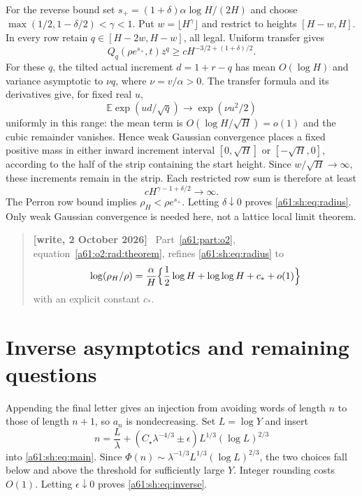 \documentclass[11pt,letterpaper]{article}
\numberwithin{equation}{section}
\theoremstyle{remark}\newtheorem{remark}[theorem]{Remark}
\newcommand{\st}{\star}
\newenvironment{writenote}{\par\smallskip\begin{quote}\small\textbf{[write, 2 October 2026]}\ }{\end{quote}\smallskip}
\begin{document}
For the reverse bound set $s_+=(1+\delta)\alpha\log H/(2H)$ and choose
$\max(1/2,1-\delta/2)<\gamma<1$. Put $w=\lfloor H^\gamma\rfloor$ and restrict to heights $[H-w,H]$. In every row retain $q\in[H-2w,H-w]$, all legal. Uniform transfer gives
\[
 Q_q(\rho e^{s_+},t)z^q
 \ge cH^{-3/2+(1+\delta)/2}.
\]
For these $q$, the tilted actual increment $d=1+r-q$ has mean $O(\log H)$ and variance asymptotic to $\nu q$, where $\nu=v/\alpha>0$. The transfer formula and its derivatives give, for fixed real $u$,
\[\mathbb E\exp(ud/\sqrt q)\longrightarrow\exp(\nu u^2/2)\]
uniformly in this range: the mean term is $O(\log H/\sqrt H)=o(1)$ and the cubic remainder vanishes. Hence weak Gaussian convergence places a fixed positive mass in either inward increment interval $[0,\sqrt H]$ or $[-\sqrt H,0]$, according to the half of the strip containing the start height. Since $w/\sqrt H\to\infty$, these increments remain in the strip. Each restricted row sum is therefore at least
\[
 cH^{\gamma-1+\delta/2}\longrightarrow\infty.
\]
The Perron row bound implies $\rho_H<\rho e^{s_+}$. Letting $\delta\downarrow0$ proves \eqref{a61:sh:eq:radius}. Only weak Gaussian convergence is needed here, not a lattice local limit theorem.
\begin{writenote}
Part~\ref{a61:part:o2}, equation~\eqref{a61:o2:rad:theorem}, refines \eqref{a61:sh:eq:radius} to
\[
 \log(\rho_H/\rho)=\frac\alpha H\Bigl\{\frac12\log H+\log\log H+c_*+o(1)\Bigr\}
\]
with an explicit constant $c_*$.
\end{writenote}


\section{Inverse asymptotics and remaining questions}
Appending the final letter gives an injection from avoiding words of length $n$ to those of length $n+1$, so $a_n$ is nondecreasing. Set $L=\log Y$ and insert
\[
 n=\frac L\lambda+
 \left(C_\st\lambda^{-4/3}\pm\epsilon\right)L^{1/3}(\log L)^{2/3}
\]
into \eqref{a61:sh:eq:main}. Since
$\Phi(n)\sim\lambda^{-1/3}L^{1/3}(\log L)^{2/3}$, the two choices fall below and above the threshold for sufficiently large $Y$. Integer rounding costs $O(1)$. Letting $\epsilon\downarrow0$ proves \eqref{a61:sh:eq:inverse}.
\end{document}
